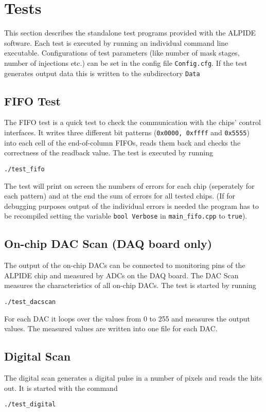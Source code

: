 \documentclass{article}
\begin{document}
\section{Tests}
This section describes the standalone test programs provided with the ALPIDE software. Each test is executed by running an individual command line executable. Configurations of test parameters (like number of mask stages, number of injections etc.) can be set in the config file \texttt{Config.cfg}. If the test generates output data this is written to the subdirectory \texttt{Data}

\subsection{FIFO Test}
The FIFO test is a quick test to check the communication with the
chips' control interfaces. It writes three different bit patterns (\texttt{0x0000, 0xffff} and
\texttt{0x5555}) into each cell of the
end-of-column FIFOs, reads them back and checks the correctness of the
readback value. The test is executed by running
\begin{verbatim}
./test_fifo
\end{verbatim}

The test will print on screen the numbers of errors for each chip (seperately for each pattern) and at the end the sum of errors for all tested chips.
(If for debugging purposes output of the individual errors is needed the program has to be recompiled setting the variable \texttt{bool Verbose} in \texttt{main\_fifo.cpp} to \texttt{true}).

\subsection {On-chip DAC Scan (DAQ board only)}
The output of the on-chip DACs can be connected to monitoring pins of
the ALPIDE chip and measured by ADCs on the DAQ board. The DAC Scan measures the characteristics of all on-chip DACs. The test is started by running
\begin{verbatim}
./test_dacscan
\end{verbatim}
For each DAC it loops over the values from 0 to 255 and measures the
output values. The measured values are written into one file for each
DAC.

\subsection{Digital Scan}
The digital scan generates a digital pulse in a number of pixels and
reads the hits out. It is started with the command
\begin{verbatim}
./test_digital
\end{verbatim}
\end{document}
